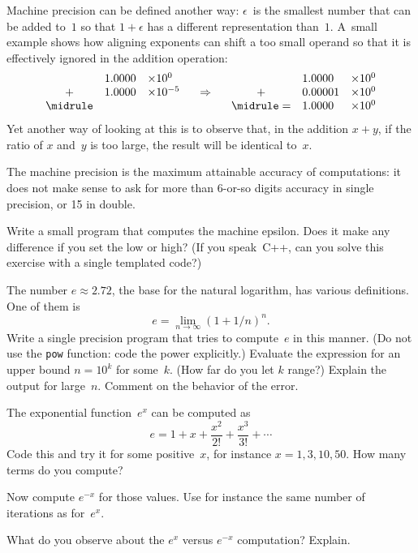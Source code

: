 Machine precision can be defined another way: $\epsilon$~is the
smallest number that can be added to~$1$ so that $1+\epsilon$ has a
different representation than~$1$. A~small example shows how aligning
exponents can shift a too small operand so that it is effectively ignored in
the addition operation:
\begin{equation}
\begin{array}{cll}
   &1.0000&\times 10^0\\
  +&1.0000&\times 10^{-5}\\ \midrule
\end{array}
\quad\Rightarrow\quad
\begin{array}{cll}
   &1.0000&\times 10^0\\
  +&0.00001&\times 10^0\\ \midrule
  =&1.0000&\times 10^0
\end{array}
\end{equation}
Yet another way of looking at this
is to observe that, in the addition $x+y$, if the ratio of $x$ and~$y$
is too large, the result will be identical to~$x$.

The machine precision is the maximum attainable accuracy of
computations: it does not make sense to ask for more than 6-or-so
digits accuracy in single precision, or 15 in double.

\begin{exercise}
  \label{ex:epsilon}%
  Write a small program that computes the machine epsilon. Does it
  make any difference if you set the
   low or high? 
  (If you speak~C++, can you solve this exercise with a single
  templated code?)
\end{exercise}

\begin{exercise}
  \label{ex:e-compute}
  The number $e\approx 2.72$, the base for the natural logarithm, has
  various definitions. One of them is 
  \begin{equation}
    e=\lim_{n\rightarrow\infty} (1+1/n)^n.
  \end{equation}
  Write a single precision program that tries to compute~$e$ in this
  manner. (Do not use the \texttt{pow} function: code the power explicitly.)
  Evaluate the expression for an upper bound $n=10^k$ for some~$k$.
  (How far do you let $k$ range?)
  Explain the output for large~$n$. Comment on the
  behavior of the error.
\end{exercise}

\begin{exercise}
  The exponential function~$e^x$ can be computed as
  \begin{equation}
    e=1+x+\frac{x^2}{2!}+\frac{x^3}{3!}+\cdots
  \end{equation}
  Code this and try it for some positive~$x$,
  for instance $x=1,3,10,50$.
  How many terms do you compute?

  Now compute $e^{-x}$ for those values.
  Use for instance the same number of iterations 
  as for~$e^x$.

  What do you observe about the $e^x$ versus $e^{-x}$
  computation? Explain.
\end{exercise}

